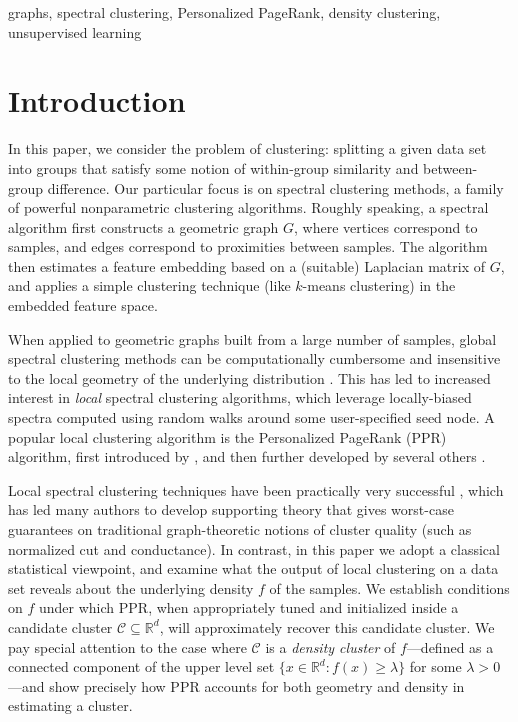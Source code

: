 \documentclass[twoside,11pt]{article}
\newcommand{\Reals}{\mathbb{R}}
\newcommand{\1}{\mathbf{1}}
\newcommand{\Rd}{\Reals^d}
\newcommand{\mc}[1]{\mathcal{#1}}
\begin{document}
\begin{keywords}
	graphs, spectral clustering, Personalized PageRank, density clustering, unsupervised learning
\end{keywords}

\section{Introduction}
In this paper, we consider the problem of clustering: splitting a given data set into groups that satisfy some notion of within-group similarity and between-group difference.  Our particular focus is on spectral clustering methods, a family of powerful nonparametric clustering algorithms. Roughly speaking, a spectral algorithm first constructs a geometric graph $G$, where vertices correspond to samples, and edges correspond to proximities between samples. The algorithm then estimates a feature embedding based on a (suitable) Laplacian matrix of $G$, and applies a simple clustering technique (like $k$-means clustering) in the embedded feature space.

When applied to geometric graphs built from a large number of samples, global spectral clustering methods can be computationally cumbersome and insensitive to the local geometry of the underlying distribution \citep{leskovec2010,mahoney2012}.  This has led to increased interest in \emph{local} spectral clustering algorithms, which leverage locally-biased spectra computed using random walks around some user-specified seed node.  A popular local clustering algorithm is the Personalized PageRank (PPR) algorithm, first introduced by \citet{haveliwala2003}, and then further developed by several others \citep{spielman2011,spielman2014,andersen2006,mahoney2012,zhu2013}.

Local spectral clustering techniques have been practically very successful \citep{leskovec2010,andersen2012,gleich2012,mahoney2012,wu2012}, which has led many authors to develop supporting theory \citep{spielman2013,andersen2009,gharan2012,zhu2013} that gives worst-case guarantees on traditional graph-theoretic notions of cluster quality (such as normalized cut and conductance). In contrast, in this paper we adopt a classical statistical viewpoint, and examine what the output of local clustering on a data set reveals about the underlying density $f$ of the samples. We establish conditions on $f$ under which PPR, when appropriately tuned and initialized inside a candidate cluster $\mc{C} \subseteq \Rd$, will approximately recover this candidate cluster. We pay special attention to the case where $\mc{C}$ is a \emph{density cluster} of $f$---defined as a connected component of the upper level set $\{x \in \Rd : f(x) \geq \lambda\}$ for some $\lambda > 0$---and show precisely how PPR accounts for both geometry and density in estimating a cluster.
\end{document}
